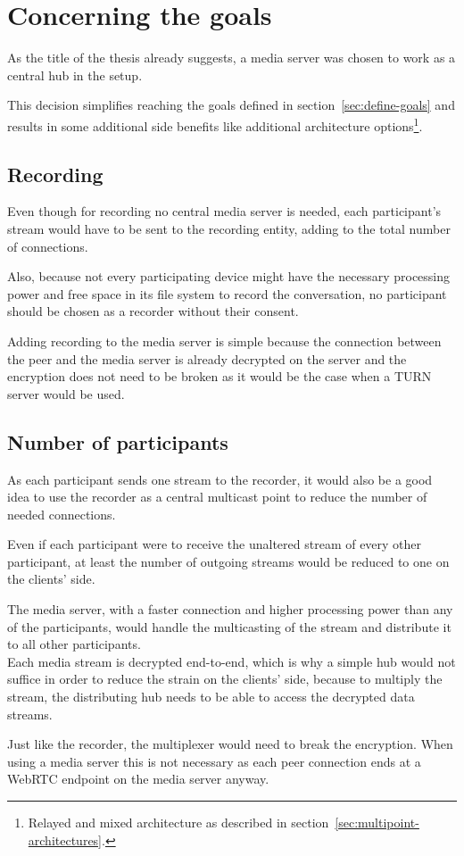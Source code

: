 \documentclass[../../../thesis.tex]{subfiles}
\begin{document}
\section{Concerning the goals}

As the title of the thesis already suggests, a media server was chosen to work as a central hub in the setup.\par
This decision simplifies reaching the goals defined in section~\ref{sec:define-goals} and results in some additional side benefits like additional architecture options\footnote{Relayed and mixed architecture as described in section~\ref{sec:multipoint-architectures}.}.

\subsection{Recording}
Even though for recording no central media server is needed, each participant's stream would have to be sent to the recording entity, adding to the total number of connections.\par
Also, because not every participating device might have the necessary processing power and free space in its file system to record the conversation, no participant should be chosen as a recorder without their consent.\par
Adding recording to the media server is simple because the connection between the peer and the media server is already decrypted on the server and the encryption does not need to be broken as it would be the case when a TURN server would be used.

\subsection{Number of participants}
As each participant sends one stream to the recorder, it would also be a good idea to use the recorder as a central multicast point to reduce the number of needed connections.\par
Even if each participant were to receive the unaltered stream of every other participant, at least the number of outgoing streams would be reduced to one on the clients' side.\par
The media server, with a faster connection and higher processing power than any of the participants, would handle the multicasting of the stream and distribute it to all other participants.\\

Each media stream is decrypted end-to-end, which is why a simple hub would not suffice in order to reduce the strain on the clients' side, because to multiply the stream, the distributing hub needs to be able to access the decrypted data streams. \par
Just like the recorder, the multiplexer would need to break the encryption. When using a media server this is not necessary as each peer connection ends at a WebRTC endpoint on the media server anyway.
\end{document}
